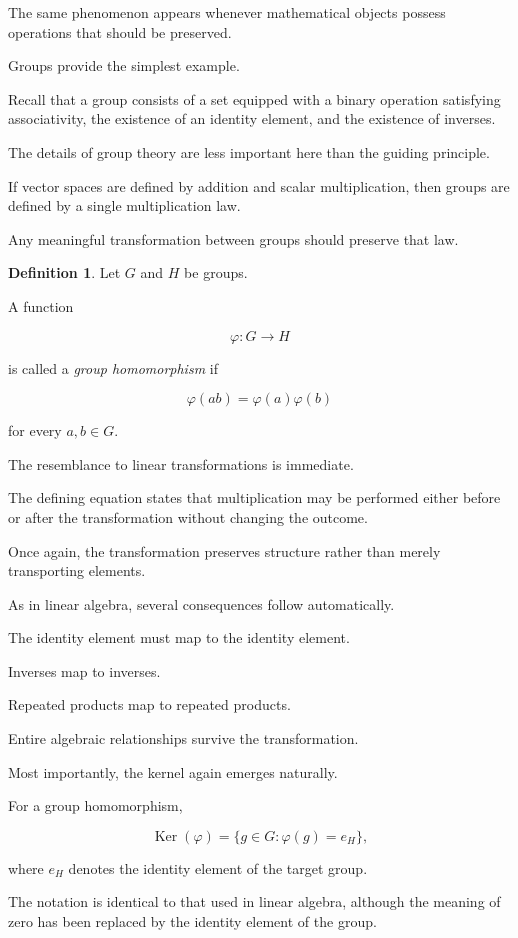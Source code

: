\documentclass[11pt]{book}
\numberwithin{equation}{chapter}
\theoremstyle{definition}
\newtheorem{definition}{Definition}[chapter]
\theoremstyle{plain}
\theoremstyle{remark}
\DeclareMathOperator{\Ker}{Ker}
\begin{document}
The same phenomenon appears whenever mathematical objects possess operations that should be preserved.

Groups provide the simplest example.

Recall that a group consists of a set equipped with a binary operation satisfying associativity, the existence of an identity element, and the existence of inverses.

The details of group theory are less important here than the guiding principle.

If vector spaces are defined by addition and scalar multiplication, then groups are defined by a single multiplication law.

Any meaningful transformation between groups should preserve that law.

\begin{definition}
Let \(G\) and \(H\) be groups.

A function

\[
\varphi:G\rightarrow H
\]

is called a \emph{group homomorphism} if

\[
\varphi(ab)
=
\varphi(a)\varphi(b)
\]

for every \(a,b\in G\).
\end{definition}

The resemblance to linear transformations is immediate.

The defining equation states that multiplication may be performed either before or after the transformation without changing the outcome.

Once again, the transformation preserves structure rather than merely transporting elements.

As in linear algebra, several consequences follow automatically.

The identity element must map to the identity element.

Inverses map to inverses.

Repeated products map to repeated products.

Entire algebraic relationships survive the transformation.

Most importantly, the kernel again emerges naturally.

For a group homomorphism,

\[
\Ker(\varphi)
=
\{g\in G:\varphi(g)=e_H\},
\]

where \(e_H\) denotes the identity element of the target group.

The notation is identical to that used in linear algebra, although the meaning of zero has been replaced by the identity element of the group.
\end{document}
